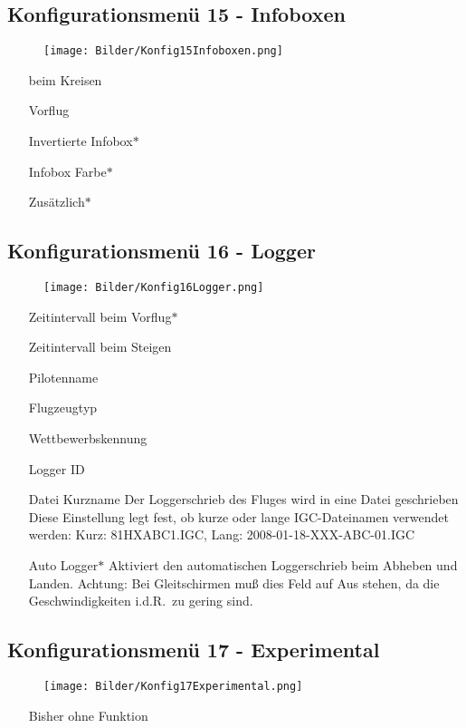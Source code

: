 \subsection{Konfigurationsmenü 15 - Infoboxen}\label{Konfig15}
\begin{wrapfigure}{r}{5.2cm}
\texttt{[image: Bilder/Konfig15Infoboxen.png]}
\end{wrapfigure}
\begin{enumerate}
\item[beim Kreisen]
\item[Vorflug]
\item[Invertierte Infobox$\ast$]
\item[Infobox Farbe$\ast$]
\item[Zusätzlich$\ast$]
\end{enumerate}

\subsection{Konfigurationsmenü 16 - Logger}\label{Konfig16}
\begin{wrapfigure}{r}{5.2cm}
\texttt{[image: Bilder/Konfig16Logger.png]}
\end{wrapfigure}
\begin{enumerate}
\item[Zeitintervall beim Vorflug$\ast$]
\item[Zeitintervall beim Steigen]
\item[Pilotenname]
\item[Flugzeugtyp]
\item[Wettbewerbskennung]
\item[Logger ID]
\item[Datei Kurzname] Der Loggerschrieb des Fluges wird in eine Datei geschrieben
Diese Einstellung legt fest, ob kurze oder lange IGC-Dateinamen verwendet werden:
Kurz: 81HXABC1.IGC,  Lang: 2008-01-18-XXX-ABC-01.IGC
\item[Auto Logger$\ast$] Aktiviert den automatischen Loggerschrieb beim Abheben und Landen. Achtung: Bei Gleitschirmen muß dies Feld auf Aus stehen, da die Geschwindigkeiten i.d.R.\ zu gering sind.
\end{enumerate}

\subsection{Konfigurationsmenü 17 - Experimental}\label{Konfig17}
\begin{wrapfigure}{r}{5.2cm}
\texttt{[image: Bilder/Konfig17Experimental.png]}
\end{wrapfigure}
\begin{enumerate}
\item[Bisher ohne Funktion]
\end{enumerate} 